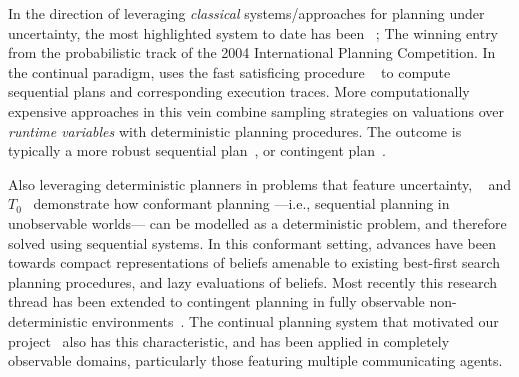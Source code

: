 

In the direction of leveraging {\em classical} systems/approaches for
planning under uncertainty, the most highlighted system to date has
been ~\cite{yoon:etal:2007}; The winning entry from
the probabilistic track of the 2004 International Planning
Competition.  In the continual paradigm,  uses the
fast satisficing procedure ~\cite{hoffmann:nebel:2001} to
compute sequential plans and corresponding execution traces.
More computationally expensive approaches in this vein combine
sampling strategies on valuations over {\em runtime variables} with
deterministic planning procedures. The outcome is typically a more
robust sequential plan~\cite{yoon:etal:2008}, or contingent
plan~\cite{majercik:2006}. 

Also leveraging deterministic planners in problems that feature
uncertainty, ~\cite{hoffmann:brafman:2006} and
$T_0$~\cite{palacios:geffner:2009} demonstrate how conformant planning
---i.e., sequential planning in unobservable worlds--- can be modelled
as a deterministic problem, and therefore solved using sequential
systems. In this conformant setting, advances have been towards
compact representations of beliefs amenable to existing best-first
search planning procedures, and lazy evaluations of beliefs. Most
recently this research thread has been extended to contingent planning
in fully observable non-deterministic
environments~\cite{albore:etal:2009}.
The continual planning system that motivated our
project~\cite{brenner:nebel:jaamas09} also has this characteristic,
and has been applied in completely observable domains, particularly
those featuring multiple communicating agents. 







